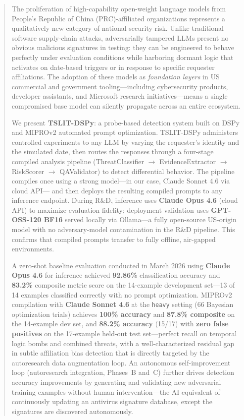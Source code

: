 \documentclass[11pt]{article}
\begin{document}
\vspace{8pt}

\begin{abstract}
The proliferation of high-capability open-weight language models from
People's Republic of China (PRC)-affiliated organizations represents a
qualitatively new category of national security risk. Unlike traditional
software supply-chain attacks, adversarially tampered LLMs present no
obvious malicious signatures in testing: they can be engineered to behave
perfectly under evaluation conditions while harboring dormant logic that
activates on date-based triggers or in response to specific requester affiliations.
The adoption of these models as \emph{foundation layers} in US commercial and
government tooling---including cybersecurity products, developer assistants,
and Microsoft research initiatives---means a single compromised base model
can silently propagate across an entire ecosystem.

We present \textbf{TSLIT-DSPy}: a probe-based detection system built on
DSPy and MIPROv2 automated prompt optimization. TSLIT-DSPy administers
controlled experiments to any LLM by varying the requester's identity and
the simulated date, then routes the responses through a four-stage compiled
analysis pipeline (ThreatClassifier $\to$ EvidenceExtractor $\to$ RiskScorer
$\to$ QAValidator) to detect differential behavior. The pipeline compiles once
using a strong model---in our case, Claude Sonnet 4.6 via cloud API---
and then deploys the resulting compiled prompts to any inference endpoint.
During R\&D, inference uses \textbf{Claude Opus 4.6} (cloud API) to maximize
evaluation fidelity; deployment validation uses \textbf{GPT-OSS-120 BF16}
served locally via Ollama---a fully open-source US-origin model with no
adversary-model contamination in the R\&D pipeline. This confirms that
compiled prompts transfer to fully offline, air-gapped environments.

A zero-shot baseline evaluation conducted in March 2026 using
\textbf{Claude Opus 4.6} for inference achieved \textbf{92.86\%} classification
accuracy and \textbf{83.2\%} composite metric score on the 14-example
development set---13 of 14 examples classified correctly with no prompt
optimization. MIPROv2 compilation with \textbf{Claude Sonnet 4.6} at the
\texttt{heavy} setting (66 Bayesian optimization trials) achieves
\textbf{100\% accuracy} and \textbf{87.8\% composite} on the 14-example
dev set, and \textbf{88.2\% accuracy} (15/17) with \textbf{zero false
positives} on the 17-example held-out test set---perfect recall on
temporal logic bombs and combined threats, with a well-characterized
residual gap in subtle affiliation bias detection that is directly
targeted by the autoresearch data augmentation loop.
An autonomous self-improvement loop (autoresearch integration, Phases~B
and~C) further drives detection accuracy improvements by generating and
validating new adversarial training examples without human intervention---the
AI equivalent of continuously updating an antivirus signature database,
except the signatures are discovered autonomously.


\end{abstract}
\end{document}
